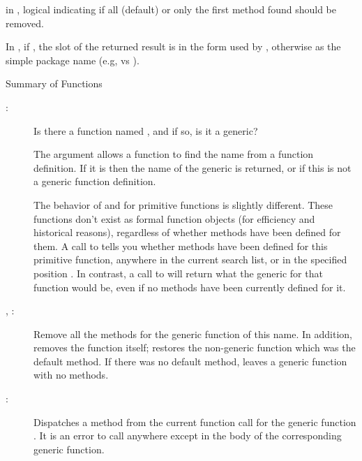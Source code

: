 \begin{Arguments}
\begin{ldescription}
\item[\code{all}] in , logical indicating if all
(default) or only the first method found should be removed.
\item[\code{searchForm}] In , if , the
 slot of the returned result is in the form used
by , otherwise as the simple package name (e.g,
 vs ).

\end{ldescription}
\end{Arguments}
%
\begin{Section}{Summary of Functions}
\begin{description}

\item[:] 
Is there a function named , and if so, is it a generic?

The  argument allows a function to find the name
from a function definition.  If it is  then the name of
the generic is returned, or  if this is not a generic
function definition.

The behavior of  and  for
primitive functions is slightly different.  These functions don't
exist as formal function objects (for efficiency and historical
reasons), regardless of whether methods have been defined for
them.  A call to  tells you whether methods have
been defined for this primitive function, anywhere in the current
search list, or in the specified position .  In
contrast, a call to  will return what the
generic for that function would be, even if no methods have been
currently defined for it.


\item[, :] 
Remove all the methods for the generic function of this
name.  In addition,  removes the function
itself;  restores the non-generic function
which was the default method.   If there was no default method,
 leaves a generic function with no methods.

\item[:] 
Dispatches a method from the current function call for the generic
function .  It is an error to call
 anywhere except in the body of the
corresponding generic function.


\end{description}
\end{Section}
